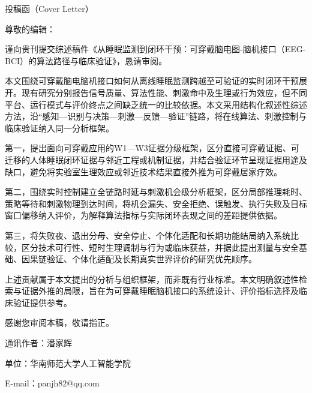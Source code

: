 \documentclass[UTF8,zihao=5,fontset=none]{ctexart}
\newcommand{\song}{\CJKfamily{song}}
\begin{document}
\thispagestyle{empty}
\begin{center}
  {\song\fontsize{22pt}{33pt}\selectfont 投稿函（{Cover Letter}）\par}
\end{center}
\vspace{48pt}
{\song\fontsize{14pt}{16.8pt}\selectfont
\setlength{\parindent}{2em}
\noindent 尊敬的编辑：\par

谨向贵刊提交综述稿件《从睡眠监测到闭环干预：可穿戴脑电图-脑机接口（EEG-BCI）的算法路径与临床验证》，恳请审阅。\par

本文围绕可穿戴脑电脑机接口如何从离线睡眠监测跨越至可验证的实时闭环干预展开。现有研究分别报告信号质量、算法性能、刺激命中及生理或行为效应，但不同平台、运行模式与评价终点之间缺乏统一的比较依据。本文采用结构化叙述性综述方法，沿“感知—识别与决策—刺激—反馈—验证”链路，将在线算法、刺激控制与临床验证纳入同一分析框架。\par

第一，提出面向可穿戴应用的W1—W3证据分级框架，区分直接可穿戴证据、可迁移的人体睡眠闭环证据与邻近工程或机制证据，并结合验证环节呈现证据用途及缺口，避免将实验室生理效应或邻近技术结果直接外推为可穿戴居家疗效。\par

第二，围绕实时控制建立全链路时延与刺激机会级分析框架，区分局部推理耗时、策略等待和刺激物理到达时间，将机会漏失、安全拒绝、误触发、执行失败及目标窗口偏移纳入评价，为解释算法指标与实际闭环表现之间的差距提供依据。\par

第三，将失败夜、退出分母、安全停止、个体化适配和长期功能结局纳入系统比较，区分技术可行性、短时生理调制与行为或临床获益，并据此提出测量与安全基础、因果链验证、个体化适配及长期真实世界评价的研究优先顺序。\par

上述贡献属于本文提出的分析与组织框架，而非既有行业标准。本文明确叙述性检索与证据外推的局限，旨在为可穿戴睡眠脑机接口的系统设计、评价指标选择及临床验证提供参考。\par

感谢您审阅本稿，敬请指正。\par
\vspace{12pt}
\noindent 通讯作者：潘家辉\par
\noindent 单位：华南师范大学人工智能学院\par
\noindent E-mail：panjh82@qq.com\par}
\end{document}
